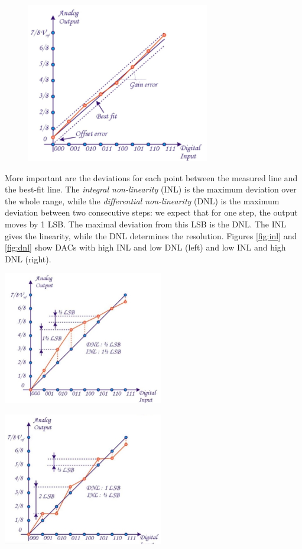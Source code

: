 \begin{figure}[h!]
	\centering
	\includegraphics[width=8cm]{figures/ch18/dac_char3.jpg}
	\caption{}
	\label{fig:dac_char3}
\end{figure}
More important are the deviations for each point between the measured line and the best-fit line. The \emph{integral non-linearity} (INL) is the maximum deviation over the whole range, while the \emph{differential non-linearity} (DNL) is the maximum deviation between two consecutive steps: we expect that for one step, the output moves by 1 LSB. The maximal deviation from this LSB is the DNL. The INL gives the linearity, while the DNL determines the resolution. Figures \ref{fig:inl} and \ref{fig:dnl} show DACs with high INL and low DNL (left) and low INL and high DNL (right).\\
\begin{minipage}{.5\textwidth}
	\centering
	\includegraphics[width=7cm]{figures/ch18/inl.jpg}
	\label{fig:inl}
\end{minipage}%
\begin{minipage}{.5\textwidth}
	\centering
	\includegraphics[width=7cm]{figures/ch18/dnl.jpg}
	\label{fig:dnl}
\end{minipage}
